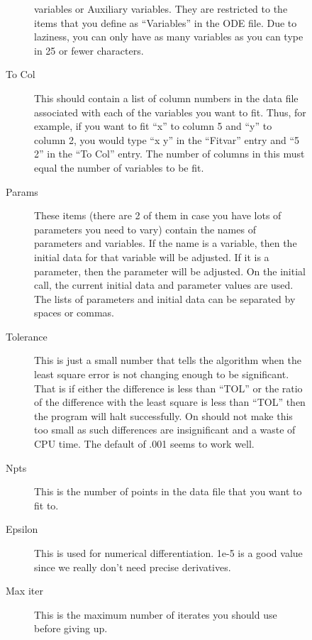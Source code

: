 \documentclass{article}
\begin{document}
\begin{description}
\begin{description}
\begin{description}
variables or Auxiliary variables.  They are restricted to the items
that you define as ``Variables'' in the ODE file.  Due to laziness,
you can only have as many variables as you can type in 25 or fewer
characters.
	\item[To Col]  This should contain a list of column numbers in
the data file associated with each of the variables you want to
fit. Thus, for example, if you want to fit ``x'' to column 5 and ``y''
to column 2, you would type ``x y'' in the ``Fitvar'' entry and ``5
2'' in the ``To Col'' entry. The number of columns in this must equal
the number of variables to be fit.
\item [Params]  These items (there are 2 of them in case you have lots
of parameters you need to vary) contain the names of parameters and
variables.  If the name is a variable, then the initial data for that
variable will be adjusted.  If it is a parameter, then the parameter
will be adjusted.  On the initial call, the current initial data and
parameter values are used. The lists of parameters and initial data
can be separated by spaces or commas.
\item [Tolerance]  This is just a small number that tells the
algorithm when the least square error is not changing enough to be
significant.  That is if either the difference is less than ``TOL'' or
the ratio of the difference with the least square is less than ``TOL''
then the program will halt successfully.  On should not make this too
small as such differences are insignificant and a waste of CPU time.
The default of .001 seems to work well.
\item [Npts]  This is the number of points in the data file that you
want to fit to.
\item [Epsilon]  This is used for numerical differentiation.  1e-5 is
a good value since we really don't need precise derivatives.
\item [Max iter] This is the maximum number of iterates you should use
before giving up.
\end{description}


\end{description}
\end{description}
\end{document}
